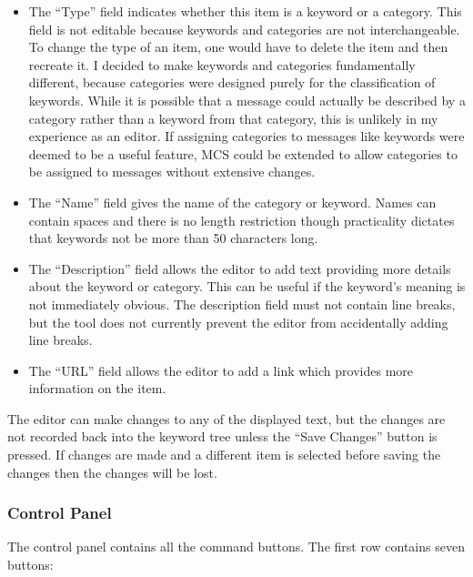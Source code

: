 \begin{itemize}
\item The ``Type'' field indicates whether this item is a keyword or a
  category. This field is not editable because keywords and categories are not
  interchangeable. To change the type of an item, one would have to delete the
  item and then recreate it. I decided to make keywords and categories
  fundamentally different, because categories were designed purely for the
  classification of keywords. While it is possible that a message could
  actually be described by a category rather than a keyword from that category,
  this is unlikely in my experience as an editor. If assigning categories to
  messages like keywords were deemed to be a useful feature, MCS could be
  extended to allow categories to be assigned to messages without extensive
  changes.
\item The ``Name'' field gives the name of the category or keyword. Names can
  contain spaces and there is no length restriction though practicality
  dictates that keywords not be more than 50 characters long.
\item The ``Description'' field allows the editor to add text providing more
  details about the keyword or category. This can be useful if the keyword's
  meaning is not immediately obvious. The description field must not contain
  line breaks, but the tool does not currently prevent the editor from
  accidentally adding line breaks.
\item The ``URL'' field allows the editor to add a link which provides more
  information on the item.
\end{itemize}

The editor can make changes to any of the displayed text, but the changes are
not recorded back into the keyword tree unless the ``Save Changes'' button is
pressed. If changes are made and a different item is selected before saving the
changes then the changes will be lost.

\subsubsection{Control Panel}
The control panel contains all the command buttons. The first row contains
seven buttons:

